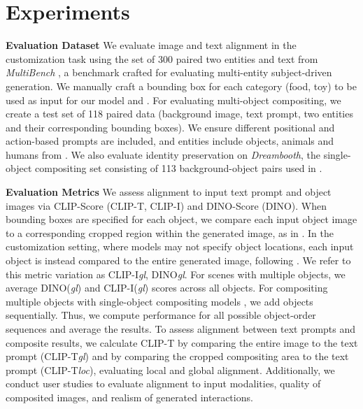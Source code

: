 \section{Experiments}
\label{sec:experiments}



\textbf{Evaluation Dataset} We evaluate image and text alignment in the customization task using the set of 300 paired two entities and text from \textit{MultiBench} \cite{li2024unimo}, a benchmark crafted for evaluating multi-entity subject-driven generation. We manually craft a bounding box for each category (\eg food, toy) to be used as input for our model and \cite{sun2024emugen}. For evaluating multi-object compositing, we create a test set of 118 paired data (background image, text prompt, two entities and their corresponding bounding boxes). We ensure different positional and action-based prompts are included, and entities include objects, animals and humans from \cite{pixabay,ruiz2023dreambooth,li2024unimo}. We also evaluate identity preservation on \textit{Dreambooth}, the single-object compositing set consisting of 113 background-object pairs used in \cite{tarres2024thinking,song2024imprint}.

\noindent
\textbf{Evaluation Metrics} We assess alignment to input text prompt and object images via CLIP-Score \cite{hessel2021clipscore} (CLIP-T, CLIP-I) and DINO-Score \cite{oquab2023dinov2} (DINO). When bounding boxes are specified for each object, we compare each input object image to a corresponding cropped region within the generated image, as in \cite{chen2023anydoor,yang2023paintbyexample,tarres2024thinking}. In the customization setting, where models may not specify object locations, each input object is instead compared to the entire generated image, following \cite{li2024unimo,pan2023kosmos}. We refer to this metric variation as CLIP-I\textit{gl}, DINO\textit{gl}. For scenes with multiple objects, we average DINO(\textit{gl}) and CLIP-I(\textit{gl}) scores across all objects.
For compositing multiple objects with single-object compositing models \cite{yang2023paintbyexample,zhang2023controlcom,chen2023anydoor,song2024imprint, tarres2024thinking}, we add objects sequentially. Thus, we compute performance for all possible object-order sequences and average the results. To assess alignment between text prompts and composite results, we calculate CLIP-T by comparing the entire image to the text prompt (CLIP-T\textit{gl}) and by comparing the cropped compositing area to the text prompt (CLIP-T\textit{loc}), evaluating local and global alignment. Additionally, we conduct user studies to evaluate alignment to input modalities, quality of composited images, and realism of generated interactions.

